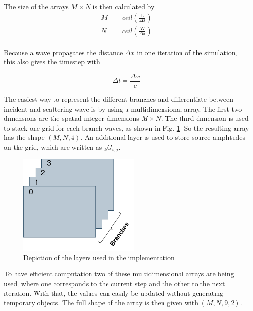 \documentclass[twocolumn]{article}
\begin{document}
The size of the arrays $M\times N$ is then calculated by
\begin{equation}
\begin{aligned}
    M &= ceil\left(\frac{\text{L}}{\Delta x}\right) \\
    N &= ceil\left(\frac{\text{W}}{\Delta x}\right) \\
\end{aligned}
\label{eq_integer_dimension}
\end{equation}

Because a wave propagates the distance $\Delta x$ in one iteration of the simulation,
this also gives the timestep with

\begin{equation}
    \Delta t = \frac{\Delta x}{c}
    \label{eq_delta_t}
\end{equation}

The easiest way to represent the different branches and differentiate between incident
and scattering wave is by using a multidimensional array.
The first two dimensions are the spatial integer dimensions $M\times N$.
The third dimension is used to stack one grid for each branch waves, as shown in Fig. \ref{fig_python_layers}.
So the resulting array has the shape $\left(M, N, 4\right)$.
An additional layer is used to store source amplitudes on the grid, which are written as $_{k}G_{i,j}$.

\begin{figure}[H]
    \centering
    \includegraphics[width=60mm]{./Images/python_layers.png}
    \caption{Depiction of the layers used in the implementation}
    \label{fig_python_layers}
\end{figure}

To have efficient computation two of these multidimensional arrays are being used,
where one corresponds to the current step and the other to the next iteration.
With that, the values can easily be updated without generating temporary objects.
The full shape of the array is then given with $\left(M, N, 9, 2\right)$.
\end{document}
